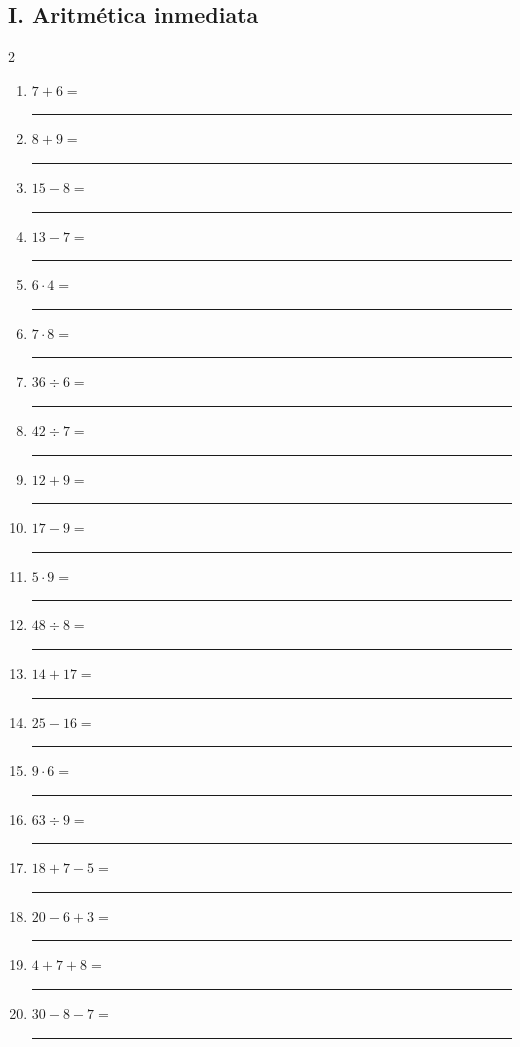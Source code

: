 \documentclass[11pt]{article}
\begin{document}
\subsection*{I. Aritmética inmediata}
\begin{multicols}{2}\begin{enumerate}[leftmargin=*,start=1]
\item $\displaystyle 7+6=$ \rule{2.2cm}{0.4pt}
\item $\displaystyle 8+9=$ \rule{2.2cm}{0.4pt}
\item $\displaystyle 15-8=$ \rule{2.2cm}{0.4pt}
\item $\displaystyle 13-7=$ \rule{2.2cm}{0.4pt}
\item $\displaystyle 6\cdot4=$ \rule{2.2cm}{0.4pt}
\item $\displaystyle 7\cdot8=$ \rule{2.2cm}{0.4pt}
\item $\displaystyle 36\div6=$ \rule{2.2cm}{0.4pt}
\item $\displaystyle 42\div7=$ \rule{2.2cm}{0.4pt}
\item $\displaystyle 12+9=$ \rule{2.2cm}{0.4pt}
\item $\displaystyle 17-9=$ \rule{2.2cm}{0.4pt}
\item $\displaystyle 5\cdot9=$ \rule{2.2cm}{0.4pt}
\item $\displaystyle 48\div8=$ \rule{2.2cm}{0.4pt}
\item $\displaystyle 14+17=$ \rule{2.2cm}{0.4pt}
\item $\displaystyle 25-16=$ \rule{2.2cm}{0.4pt}
\item $\displaystyle 9\cdot6=$ \rule{2.2cm}{0.4pt}
\item $\displaystyle 63\div9=$ \rule{2.2cm}{0.4pt}
\item $\displaystyle 18+7-5=$ \rule{2.2cm}{0.4pt}
\item $\displaystyle 20-6+3=$ \rule{2.2cm}{0.4pt}
\item $\displaystyle 4+7+8=$ \rule{2.2cm}{0.4pt}
\item $\displaystyle 30-8-7=$ \rule{2.2cm}{0.4pt}
\end{enumerate}\end{multicols}
\end{document}
